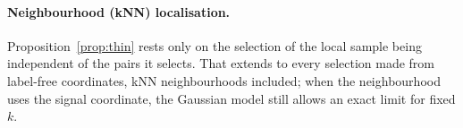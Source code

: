 
\paragraph{Neighbourhood (kNN) localisation.} Proposition~\ref{prop:thin} rests only on the selection of the local sample being independent of the pairs it selects. That extends to every selection made from label-free coordinates, kNN neighbourhoods included; when the neighbourhood uses the signal coordinate, the Gaussian model still allows an exact limit for fixed $k$.

